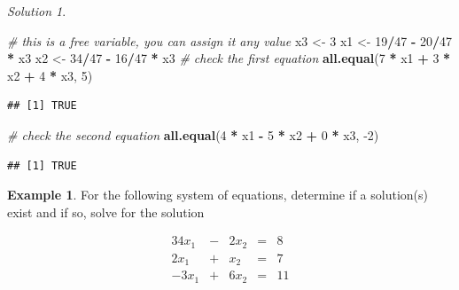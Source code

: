 \documentclass[
]{book}
\newenvironment{Shaded}{\begin{snugshade}}{\end{snugshade}}
\newcommand{\CommentTok}[1]{\textcolor[rgb]{0.56,0.35,0.01}{\textit{#1}}}
\newcommand{\DecValTok}[1]{\textcolor[rgb]{0.00,0.00,0.81}{#1}}
\newcommand{\KeywordTok}[1]{\textcolor[rgb]{0.13,0.29,0.53}{\textbf{#1}}}
\newcommand{\NormalTok}[1]{#1}
\newcommand{\OperatorTok}[1]{\textcolor[rgb]{0.81,0.36,0.00}{\textbf{#1}}}
\newcommand{\StringTok}[1]{\textcolor[rgb]{0.31,0.60,0.02}{#1}}
\theoremstyle{definition}
\theoremstyle{definition}
\newtheorem{example}{Example}[chapter]
\theoremstyle{definition}
\theoremstyle{definition}
\theoremstyle{remark}
\newtheorem*{solution}{Solution}
\begin{document}
\begin{solution}
\begin{Shaded}
\begin{Highlighting}[]
\CommentTok{# this is a free variable, you can assign it any value}
\NormalTok{x3 <-}\StringTok{ }\DecValTok{3}
\NormalTok{x1 <-}\StringTok{ }\DecValTok{19}\OperatorTok{/}\DecValTok{47} \OperatorTok{-}\StringTok{ }\DecValTok{20}\OperatorTok{/}\DecValTok{47} \OperatorTok{*}\StringTok{ }\NormalTok{x3}
\NormalTok{x2 <-}\StringTok{ }\DecValTok{34}\OperatorTok{/}\DecValTok{47} \OperatorTok{-}\StringTok{ }\DecValTok{16}\OperatorTok{/}\DecValTok{47} \OperatorTok{*}\StringTok{ }\NormalTok{x3}
\CommentTok{# check the first equation}
\KeywordTok{all.equal}\NormalTok{(}\DecValTok{7} \OperatorTok{*}\StringTok{ }\NormalTok{x1 }\OperatorTok{+}\StringTok{ }\DecValTok{3} \OperatorTok{*}\StringTok{ }\NormalTok{x2 }\OperatorTok{+}\StringTok{ }\DecValTok{4} \OperatorTok{*}\StringTok{ }\NormalTok{x3, }\DecValTok{5}\NormalTok{)}
\end{Highlighting}
\end{Shaded}

\begin{verbatim}
## [1] TRUE
\end{verbatim}

\begin{Shaded}
\begin{Highlighting}[]
\CommentTok{# check the second equation}
\KeywordTok{all.equal}\NormalTok{(}\DecValTok{4} \OperatorTok{*}\StringTok{ }\NormalTok{x1 }\OperatorTok{-}\StringTok{ }\DecValTok{5} \OperatorTok{*}\StringTok{ }\NormalTok{x2 }\OperatorTok{+}\StringTok{ }\DecValTok{0} \OperatorTok{*}\StringTok{ }\NormalTok{x3, }\DecValTok{-2}\NormalTok{)}
\end{Highlighting}
\end{Shaded}

\begin{verbatim}
## [1] TRUE
\end{verbatim}

\end{solution}

\begin{example}
For the following system of equations, determine if a solution(s) exist and if so, solve for the solution

\begin{alignat*}{3}
4 x_1 & {}-{} & 2 x_2 & {}={} & 8\\
2 x_1 & {}+{} & x_2 & {}={} & 7 \\
-3 x_1 & {}+{} & 6 x_2 &{}={} & 11
\end{alignat*}
\end{example}
\end{document}
